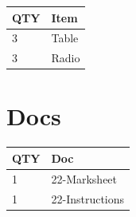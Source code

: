 \documentclass[10pt, A5]{article}
\begin{document}
\begin{framed}
\begin{minipage}{\textwidth}
\begin{multicols}{2}
		
	\begin{center}
			\begin{tabular}{p{2cm}p{4cm}}


				\textbf{QTY} & \textbf{Item} \\\toprule
												3&Table\\\midrule
												3&Radio\\\midrule
								\end{tabular}

			\end{center}

		
		\vfill\null
		\columnbreak

			\section*{\faFile \: Docs}
		 	\begin{center}
			\begin{tabular}{p{2cm}p{4cm}}

			\textbf{QTY} & \textbf{Doc} \\\toprule
										1&22-Marksheet\\\midrule
										1&22-Instructions\\\midrule
							\end{tabular}
			\end{center}
	

		\vfill\null

		\end{multicols}
\end{minipage}
\end{framed}
\end{document}
